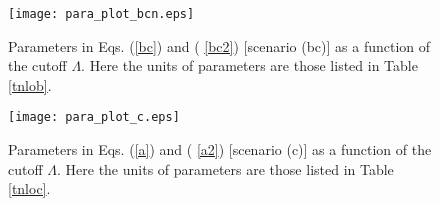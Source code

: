 \documentclass[aps,11pt,prc,preprint,superscriptaddress,nofootinbib]{revtex4}
\begin{document}
\begin{figure}[tbp]
\texttt{[image: para\_plot\_bcn.eps]}
\caption{Parameters in Eqs. (\protect\ref{bc}) and (\protect
\ref{bc2}) [scenario (bc)] as a function of the cutoff $\Lambda$. Here the units of parameters are those listed in Table \ref{tnlob}.}
\label{parabc}
\end{figure}

\begin{figure}[tbp]
\texttt{[image: para\_plot\_c.eps]}
\caption{Parameters in Eqs. (\protect\ref{a}) and (\protect
\ref{a2}) [scenario (c)] as a function of the cutoff $\Lambda$. Here the units of parameters are those listed in Table \ref{tnloc}.}
\label{parac}
\end{figure}








\appendix


\end{document}
